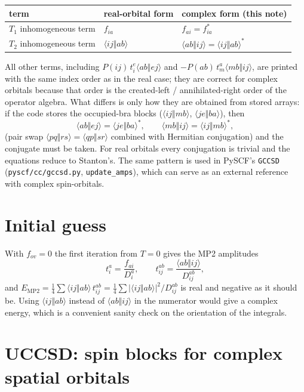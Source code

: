 \documentclass[11pt]{article}
\newcommand{\anti}[4]{\langle #1#2\Vert #3#4\rangle}
\begin{document}
\begin{center}
\begin{tabular}{lll}
term & real-orbital form & complex form (this note)\\ \hline
$T_1$ inhomogeneous term & $f_{ia}$ & $f_{ai}=f_{ia}^*$\\
$T_2$ inhomogeneous term & $\anti{i}{j}{a}{b}$ & $\anti{a}{b}{i}{j}=\anti{i}{j}{a}{b}^*$
\end{tabular}
\end{center}

All other terms, including $P(ij)\,t_i^e\anti{a}{b}{e}{j}$ and
$-P(ab)\,t_m^a\anti{m}{b}{i}{j}$, are printed with the same index order as in
the real case; they are correct for complex orbitals because that order is the
created-left / annihilated-right order of the operator algebra. What differs
is only how they are obtained from stored arrays: if the code stores the
occupied-bra blocks ($\anti{i}{j}{m}{b}$, $\anti{j}{e}{b}{a}$), then
\begin{equation}
\anti{a}{b}{e}{j}=\anti{j}{e}{b}{a}^*,\qquad
\anti{m}{b}{i}{j}=\anti{i}{j}{m}{b}^*,
\end{equation}
(pair swap $\anti{p}{q}{r}{s}=\anti{q}{p}{s}{r}$ combined with Hermitian
conjugation) and the conjugate must be taken. For real orbitals every
conjugation is trivial and the equations reduce to Stanton's. The same
pattern is used in PySCF's \texttt{GCCSD} (\texttt{pyscf/cc/gccsd.py},
\texttt{update\_amps}), which can serve as an external reference with complex
spin-orbitals.

\section{Initial guess}

With $f_{ov}=0$ the first iteration from $T=0$ gives the MP2 amplitudes
\begin{equation}
t_i^a=\frac{f_{ai}}{D_i^a},\qquad
t_{ij}^{ab}=\frac{\anti{a}{b}{i}{j}}{D_{ij}^{ab}},
\end{equation}
and $E_{\mathrm{MP2}}=\tfrac14\sum\anti{i}{j}{a}{b}\,t_{ij}^{ab}
=\tfrac14\sum|\anti{i}{j}{a}{b}|^2/D_{ij}^{ab}$ is real and negative as it
should be. Using $\anti{i}{j}{a}{b}$ instead of $\anti{a}{b}{i}{j}$ in the
numerator would give a complex energy, which is a convenient sanity check on
the orientation of the integrals.

\section{UCCSD: spin blocks for complex spatial orbitals}
\label{sec:blocks}
\end{document}
